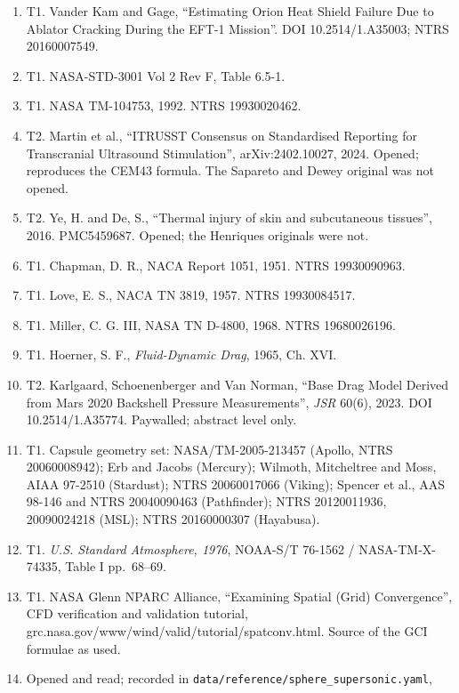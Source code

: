 \documentclass[
  a4paper,
  11pt]{article}
\newcommand{\tierok}{{\color{good}\ding{51}}}
\newcommand{\tiermid}{{\color{warn}\ding{108}}}
\begin{document}
\begin{enumerate}
\item
  \tierok{} T1. Vander Kam and Gage, ``Estimating Orion Heat Shield
  Failure Due to Ablator Cracking During the EFT-1 Mission''. DOI
  10.2514/1.A35003; NTRS 20160007549.
\item
  \tierok{} T1. NASA-STD-3001 Vol 2 Rev F, Table 6.5-1.
\item
  \tierok{} T1. NASA TM-104753, 1992. NTRS 19930020462.
\item
  \tiermid{} T2. Martin et al., ``ITRUSST Consensus on Standardised
  Reporting for Transcranial Ultrasound Stimulation'', arXiv:2402.10027,
  2024. Opened; reproduces the CEM43 formula. The Sapareto and Dewey
  original was not opened.
\item
  \tiermid{} T2. Ye, H. and De, S., ``Thermal injury of skin and
  subcutaneous tissues'', 2016. PMC5459687. Opened; the Henriques
  originals were not.
\item
  \tierok{} T1. Chapman, D. R., NACA Report 1051, 1951. NTRS
  19930090963.
\item
  \tierok{} T1. Love, E. S., NACA TN 3819, 1957. NTRS 19930084517.
\item
  \tierok{} T1. Miller, C. G. III, NASA TN D-4800, 1968. NTRS
  19680026196.
\item
  \tierok{} T1. Hoerner, S. F., \emph{Fluid-Dynamic Drag}, 1965, Ch.
  XVI.
\item
  \tiermid{} T2. Karlgaard, Schoenenberger and Van Norman, ``Base Drag
  Model Derived from Mars 2020 Backshell Pressure Measurements'',
  \emph{JSR} 60(6), 2023. DOI 10.2514/1.A35774. Paywalled; abstract
  level only.
\item
  \tierok{} T1. Capsule geometry set: NASA/TM-2005-213457 (Apollo, NTRS
  20060008942); Erb and Jacobs (Mercury); Wilmoth, Mitcheltree and Moss,
  AIAA 97-2510 (Stardust); NTRS 20060017066 (Viking); Spencer et al.,
  AAS 98-146 and NTRS 20040090463 (Pathfinder); NTRS 20120011936,
  20090024218 (MSL); NTRS 20160000307 (Hayabusa).
\item
  \tierok{} T1. \emph{U.S. Standard Atmosphere, 1976}, NOAA-S/T 76-1562
  / NASA-TM-X-74335, Table I pp.~68--69.
\item
  \tierok{} T1. NASA Glenn NPARC Alliance, ``Examining Spatial (Grid)
  Convergence'', CFD verification and validation tutorial,
  grc.nasa.gov/\allowbreak{}www/\allowbreak{}wind/\allowbreak{}valid/\allowbreak{}tutorial/\allowbreak{}spatconv.html.
  Source of the GCI formulae as used.
\item
  Opened and read; recorded in
  \texttt{data/\allowbreak{}reference/\allowbreak{}sphere\_\allowbreak{}supersonic.yaml},

\end{enumerate}
\end{document}
